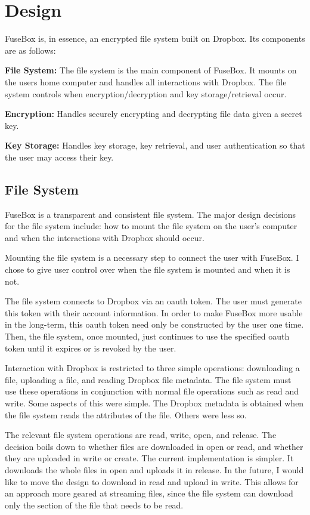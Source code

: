 \documentclass[11pt,twocolumn,letterpaper]{article}
\newcommand{\appname}{FuseBox }
\newcommand{\appnameWOspace}{FuseBox}
\begin{document}
\section{Design}
\label{sec:design}
\appname is, in essence, an encrypted file system built on
Dropbox. Its components are as follows:
\par {\bf File System:} The file system is the main component of 
\appnameWOspace. It mounts on the users home computer and handles 
all interactions with Dropbox. The file system controls when
encryption/decryption and key storage/retrieval occur.   
\par {\bf Encryption:} Handles securely encrypting and decrypting file data
given a secret key. 
\par {\bf Key Storage:} Handles key storage, key retrieval, and user
authentication so that the user may access their key. 

\subsection{File System}
\label{sec:fs}
\appname is a transparent and consistent file system. The major design
decisions for the file system include: how to mount the file system on
the user's computer and when the interactions with Dropbox should
occur. 
\par Mounting the file system is a necessary step to connect the user
with \appnameWOspace. I chose to give user control over when the file
system is mounted and when it is not.  
\par The file system connects to Dropbox via an oauth token. The user must
generate this token with their account information. In order to make
\appname more usable in the long-term, this oauth token need only be
constructed by the user one time. Then, the file system, once mounted,
just continues to use the specified oauth token until it expires or is
revoked by the user. 
\par Interaction with Dropbox is restricted to three simple
operations: downloading a file, uploading a file, and reading Dropbox
file metadata. The file system must use these operations in
conjunction with normal file operations such as read and write. Some
aspects of this were simple. The Dropbox metadata is obtained when the
file system reads the attributes of the file. Others were less so.
\par The relevant file system operations are read, write, open, and
release. The decision boils down to whether files are downloaded in
open or read, and whether they are uploaded in write or create. The
current implementation is simpler. It downloads the whole files in
open and uploads it in
release. In the future, I would like to move the design to download in
read and upload in write. This allows for an approach more geared at
streaming files, since the file system can download only the section of the file that
needs to be read. 
\end{document}
